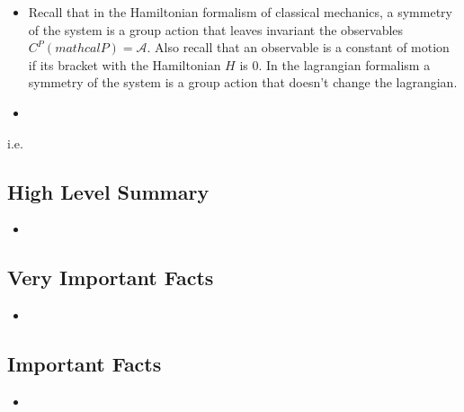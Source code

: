 \documentclass{article}
\begin{document}
\begin{itemize}
\begin{itemize}
        \item Recall that in the Hamiltonian formalism of classical mechanics, a symmetry of the system is a group action that leaves invariant the observables $C^P(mathcal P) = \mathcal A$. Also recall that an observable is a constant of motion if its bracket with the Hamiltonian $H$ is 0. {\tiny In the lagrangian formalism a symmetry of the system is a group action that doesn't change the lagrangian}.
        
        \item 
            
        \end{itemize}i.e. 
    
    \end{itemize}

\subsection{High Level Summary}

    \begin{itemize}

    \item 
    
    \end{itemize}

\subsection{Very Important Facts}

    \begin{itemize}

    \item 
    
    \end{itemize}

\subsection{Important Facts}

    \begin{itemize}

    \item 
    
    \end{itemize}
\end{document}
